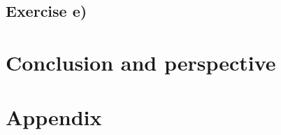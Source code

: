 \documentclass{article}
\begin{document}
  \subsection{Exercise e)} \label{sec:Results e)}








\vspace{1cm}

\section{Conclusion and perspective} \label{sec:Conclusion}



\vspace{1cm}

\section{Appendix} \label{sec:Appendix}


\end{document}
